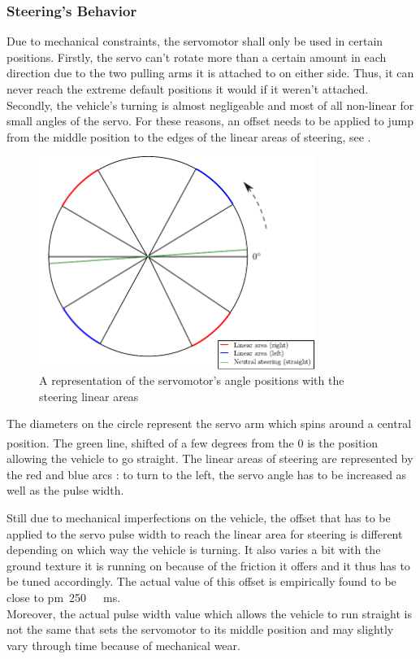 \subsubsection{Steering's Behavior}\label{sec:SteeringBehavior}
Due to mechanical constraints, the servomotor shall only be used in certain positions. 
Firstly, the servo can't rotate more than a certain amount in each direction due to the two pulling arms it is attached to on either side. Thus, it can never reach the extreme default positions it would if it weren't attached.
Secondly, the vehicle's turning is almost negligeable and most of all non-linear for small angles of the servo. For these reasons, an offset needs to be applied to jump from the middle position to the edges of the linear areas of steering, see .

\begin{figure}[H]
  \centering  
  \includegraphics[width=0.8\textwidth]{figures/servoSteeringLinearArea.pdf}
  \caption{A representation of the servomotor's angle positions with the steering linear areas}
  \label{fig:servoSteeringLinearArea}
\end{figure}

The diameters on the circle represent the servo arm which spins around a central position. The green line, shifted of a few degrees from the \si{0^{\circ}} is the position allowing the vehicle to go straight. The linear areas of steering are represented by the red and blue arcs : to turn to the left, the servo angle has to be increased as well as the pulse width.

Still due to mechanical imperfections on the vehicle, the offset that has to be applied to the servo pulse width to reach the linear area for steering is different depending on which way the vehicle is turning. It also varies a bit with the ground texture it is running on because of the friction it offers and it thus has to be tuned accordingly.
The actual value of this offset is empirically found to be close to \si{\pm 250\ ms}.\\
%
Moreover, the actual pulse width value which allows the vehicle to run straight is not the same that sets the servomotor to its middle position and may slightly vary through time because of mechanical wear.